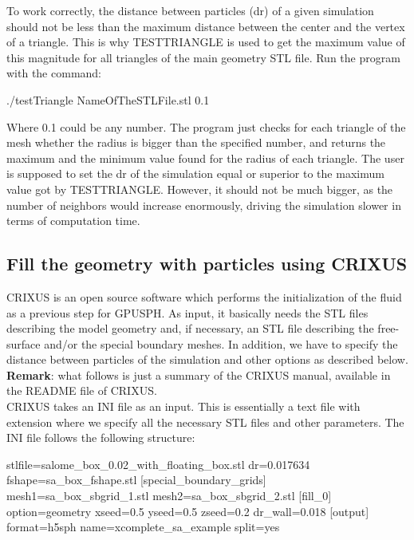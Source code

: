 \documentclass{../GPUSPHtemplate}
\begin{document}
To work correctly, the distance between particles (dr) of a given simulation 
should not be less than the maximum distance between the center and the 
vertex of a triangle. This is why TESTTRIANGLE is used to get the maximum 
value of this magnitude for all triangles of the main geometry STL file. 
Run the program with the command:
\begin{shellcode}
./testTriangle NameOfTheSTLFile.stl 0.1
\end{shellcode}
Where 0.1 could be any number. 
The program just checks for each triangle of the mesh whether the 
radius is bigger than the specified number, and returns the 
maximum and the minimum value found for the radius of each triangle. 
The user is supposed to set the dr of the simulation equal 
or superior to the maximum value got by TESTTRIANGLE. 
However, it should not be much bigger, as the number of neighbors 
would increase enormously, driving the simulation slower in terms of computation time.

\subsection{Fill the geometry with particles using CRIXUS}

CRIXUS is an open source software which performs the initialization 
of the fluid as a previous step for GPUSPH. 
As input, it basically needs the STL files describing the model geometry 
and, if necessary, an STL file describing the free-surface and/or the special 
boundary meshes. 
In addition, we have to specify the distance between particles 
of the simulation and other options as described below.\\

\textbf{Remark}: what follows is just a summary of the CRIXUS manual, 
available in the README file of CRIXUS.\\

CRIXUS takes an INI file as an input. 
This is essentially a text file with  extension 
where we specify all the necessary STL files and other parameters.
The INI file follows the following structure:
\begin{ccode}
[mesh]
  stlfile=salome_box_0.02_with_floating_box.stl
  dr=0.017634
  fshape=sa_box_fshape.stl
[special_boundary_grids]
  mesh1=sa_box_sbgrid_1.stl
  mesh2=sa_box_sbgrid_2.stl
[fill_0]
  option=geometry
  xseed=0.5
  yseed=0.5
  zseed=0.2
  dr_wall=0.018
[output]
  format=h5sph
  name=xcomplete_sa_example
  split=yes
\end{ccode}
\end{document}
